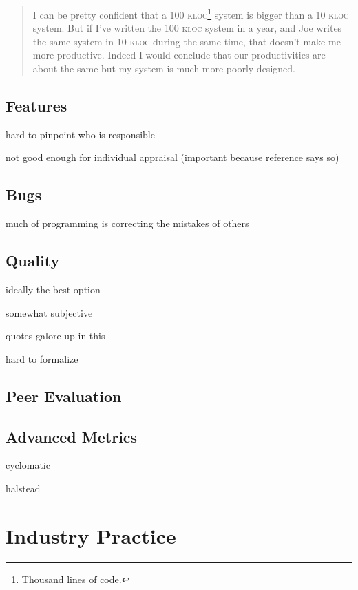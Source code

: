 \documentclass[letterpaper, 12pt]{report}
\begin{document}
\begin{quote}
I can be pretty confident that a 100 \textsc{kloc}\footnote{Thousand lines of code.} system is bigger than a 10 \textsc{kloc} system. But if I've written the 100 \textsc{kloc} system in a year, and Joe writes the same system in 10 \textsc{kloc} during the same time, that doesn't make me more productive. Indeed I would conclude that our productivities are about the same but my system is much more poorly designed.
\end{quote}


\subsection{Features}
hard to pinpoint who is responsible

not good enough for individual appraisal (important because reference says so)

\subsection{Bugs}
much of programming is correcting the mistakes of others

\subsection{Quality}
ideally the best option

somewhat subjective

quotes galore up in this

hard to formalize

\subsection{Peer Evaluation}

\subsection{Advanced Metrics}
cyclomatic

halstead

\section{Industry Practice}
\end{document}
